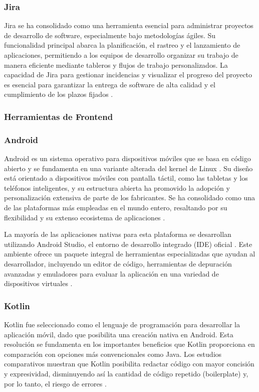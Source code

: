 \subsubsection*{\hspace{0.7cm}Jira}
Jira se ha consolidado como una herramienta esencial para administrar proyectos de desarrollo de software, especialmente bajo metodologías ágiles. Su funcionalidad principal abarca la planificación, el rastreo y el lanzamiento de aplicaciones, permitiendo a los equipos de desarrollo organizar su trabajo de manera eficiente mediante tableros y flujos de trabajo personalizados. La capacidad de Jira para gestionar incidencias y visualizar el progreso del proyecto es esencial para garantizar la entrega de software de alta calidad y el cumplimiento de los plazos fijados \cite{li2018jira}.

\subsubsection{Herramientas de Frontend}

\subsubsection*{\hspace{0.7cm}Android}
Android es un sistema operativo para dispositivos móviles que se basa en código abierto y se fundamenta en una variante alterada del kernel de Linux \cite{uttarwar2021literature}. Su diseño está orientado a dispositivos móviles con pantalla táctil, como las tabletas y los teléfonos inteligentes, y su estructura abierta ha promovido la adopción y personalización extensiva de parte de los fabricantes. Se ha consolidado como una de las plataformas más empleadas en el mundo entero, resaltando por su flexibilidad y su extenso ecosistema de aplicaciones \cite{uttarwar2021literature}.

La mayoría de las aplicaciones nativas para esta plataforma se desarrollan utilizando Android Studio, el entorno de desarrollo integrado (IDE) oficial \cite{chaubey2023integrated}. Este ambiente ofrece un paquete integral de herramientas especializadas que ayudan al desarrollador, incluyendo un editor de código, herramientas de depuración avanzadas y emuladores para evaluar la aplicación en una variedad de dispositivos virtuales \cite{chaubey2023integrated}.

\subsubsection*{\hspace{0.7cm}Kotlin}
Kotlin fue seleccionado como el lenguaje de programación para desarrollar la aplicación móvil, dado que posibilita una creación nativa en Android. Esta resolución se fundamenta en los importantes beneficios que Kotlin proporciona en comparación con opciones más convencionales como Java. Los estudios comparativos muestran que Kotlin posibilita redactar código con mayor concisión y expresividad, disminuyendo así la cantidad de código repetido (boilerplate) y, por lo tanto, el riesgo de errores \cite{putranto2020comparative}.

